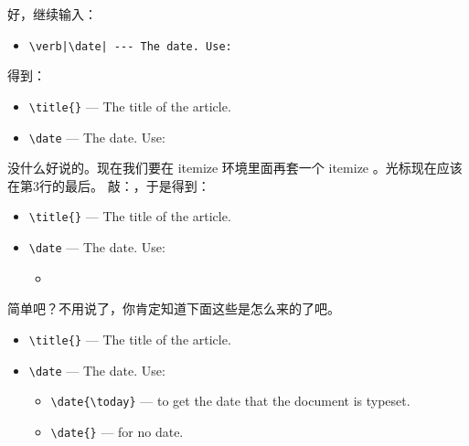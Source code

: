 好，继续输入：

\begin{itemize}
\item[] \verb'\verb|\date| --- The date. Use:'
\end{itemize}

得到：
\begin{codeblock}[.9]
\begin{latexcode}
  \begin{itemize}
  \item \verb|\title{}| --- The title of the article.
  \item \verb|\date| --- The date. Use: 
  \end{itemize}
\end{latexcode}
\end{codeblock}
没什么好说的。现在我们要在 itemize 环境里面再套一个 itemize 。光标现在应该在第3行的最后。
敲：\;\;，于是得到：

\begin{codeblock}[.9]
\begin{latexcode}
  \begin{itemize}
  \item \verb|\title{}| --- The title of the article.
  \item \verb|\date| --- The date. Use:
    \begin{itemize}
    \item 
    \end{itemize}

  \end{itemize}
\end{latexcode}
\end{codeblock}

简单吧？不用说了，你肯定知道下面这些是怎么来的了吧。

\begin{codeblock}[.9]
\begin{latexcode}
  \begin{itemize}
  \item \verb|\title{}| --- The title of the article.
  \item \verb|\date| --- The date. Use:
    \begin{itemize}
    \item \verb|\date{\today}| --- to get the date that
      the document is typeset.
    \item \verb|\date{}| --- for no date.
    \end{itemize}
  \end{itemize}
\end{latexcode}
\end{codeblock}

